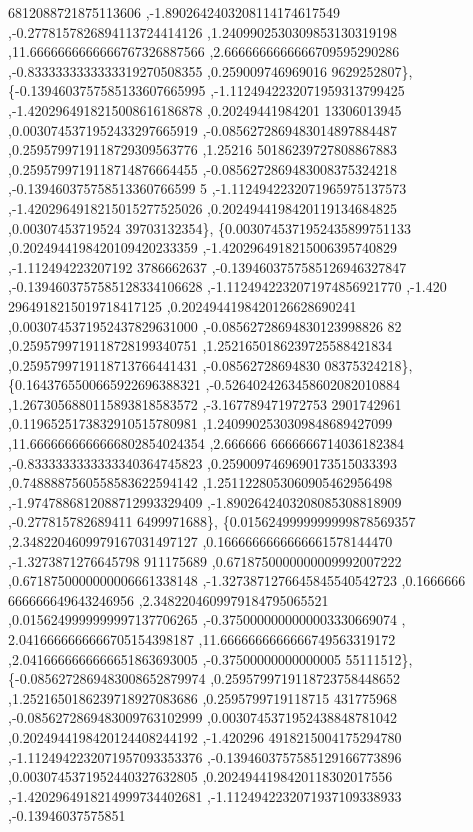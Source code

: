 \begin{DoxyCode}
      6812088721875113606 ,-1.8902642403208114174617549 ,-0.2778157826894113724414126 ,1.2409902530309853130319198
       ,11.6666666666666767326887566 ,2.6666666666666709595290286 ,-0.8333333333333319270508355 ,0.259009746969016
      9629252807\},
\{-0.1394603757585133607665995 ,-1.1124942232071959313799425 ,-1.4202964918215008616186878 ,0.20249441984201
      13306013945 ,0.0030745371952433297665919 ,-0.0856272869483014897884487 ,0.2595799719118729309563776 ,1.25216
      50186239727808867883 ,0.2595799719118714876664455 ,-0.0856272869483008375324218 ,-0.139460375758513360766599
      5 ,-1.1124942232071965975137573 ,-1.4202964918215015277525026 ,0.2024944198420119134684825 ,0.00307453719524
      39703132354\},
\{0.0030745371952435899751133 ,0.2024944198420109420233359 ,-1.4202964918215006395740829 ,-1.112494223207192
      3786662637 ,-0.1394603757585126946327847 ,-0.1394603757585128334106628 ,-1.1124942232071974856921770 ,-1.420
      2964918215019718417125 ,0.2024944198420126628690241 ,0.0030745371952437829631000 ,-0.08562728694830123998826
      82 ,0.2595799719118728199340751 ,1.2521650186239725588421834 ,0.2595799719118713766441431 ,-0.08562728694830
      08375324218\},
\{0.1643765500665922696388321 ,-0.5264024263458602082010884 ,1.2673056880115893818583572 ,-3.167789471972753
      2901742961 ,0.1196525173832910515780981 ,1.2409902530309848689427099 ,11.6666666666666802854024354 ,2.666666
      6666666714036182384 ,-0.8333333333333340364745823 ,0.2590097469690173515033393 ,0.7488887560558583622594142 
      ,1.2511228053060905462956498 ,-1.9747886812088712993329409 ,-1.8902642403208085308818909 ,-0.277815782689411
      6499971688\},
\{0.0156249999999999878569357 ,2.3482204609979167031497127 ,0.1666666666666661578144470 ,-1.3273871276645798
      911175689 ,0.6718750000000009992007222 ,0.6718750000000006661338148 ,-1.3273871276645845540542723 ,0.1666666
      666666649643246956 ,2.3482204609979184795065521 ,0.0156249999999997137706265 ,-0.3750000000000003330669074 ,
      2.0416666666666705154398187 ,11.6666666666666749563319172 ,2.0416666666666651863693005 ,-0.37500000000000005
      55111512\},
\{-0.0856272869483008652879974 ,0.2595799719118723758448652 ,1.2521650186239718927083686 ,0.2595799719118715
      431775968 ,-0.0856272869483009763102999 ,0.0030745371952438848781042 ,0.2024944198420124408244192 ,-1.420296
      4918215004175294780 ,-1.1124942232071957093353376 ,-0.1394603757585129166773896 ,0.0030745371952440327632805
       ,0.2024944198420118302017556 ,-1.4202964918214999734402681 ,-1.1124942232071937109338933 ,-0.13946037575851

\end{DoxyCode}
